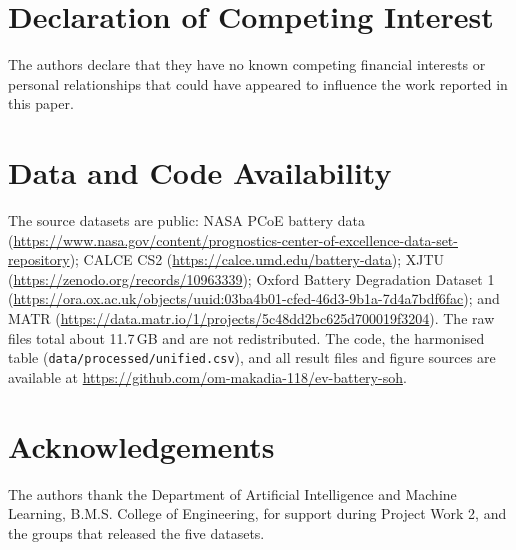 \documentclass[journal]{IEEEtran}
\begin{document}
\section*{Declaration of Competing Interest}
The authors declare that they have no known competing financial interests or personal relationships that could have appeared to influence the work reported in this paper.

\section*{Data and Code Availability}
The source datasets are public: NASA PCoE battery data~\cite{saha2007nasa} (\url{https://www.nasa.gov/content/prognostics-center-of-excellence-data-set-repository}); CALCE CS2 (\url{https://calce.umd.edu/battery-data}); XJTU (\url{https://zenodo.org/records/10963339}); Oxford Battery Degradation Dataset 1 (\url{https://ora.ox.ac.uk/objects/uuid:03ba4b01-cfed-46d3-9b1a-7d4a7bdf6fac}); and MATR (\url{https://data.matr.io/1/projects/5c48dd2bc625d700019f3204}). The raw files total about 11.7\,GB and are not redistributed. The code, the harmonised table (\texttt{data/processed/unified.csv}), and all result files and figure sources are available at \url{https://github.com/om-makadia-118/ev-battery-soh}.

\section*{Acknowledgements}
The authors thank the Department of Artificial Intelligence and Machine Learning, B.M.S. College of Engineering, for support during Project Work 2, and the groups that released the five datasets.



\end{document}
